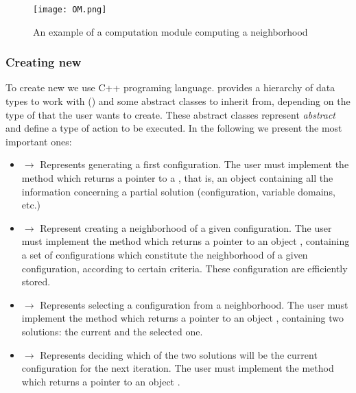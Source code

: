 \begin{figure}
	\centering	
	\texttt{[image: OM.png]}
	\caption{An example of a computation module computing a neighborhood}\label{fig:om}
\end{figure}

\subsubsection{Creating new \oms}
\label{subsubsec:creatingoms}

To create new \oms{} we use C++ programing language. \posl{} provides a hierarchy of data types to work with () and some abstract classes to inherit from, depending on the type of \om{} that the user wants to create. These abstract classes represent {\it abstract} \om{} and define a type of action to be executed. In the following we present the most important ones:

\begin{itemize}
\item {} $\rightarrow$ Represents \oms{} generating a first configuration. The user must implement the method  which returns a pointer to a , that is, an object containing all the information concerning a partial solution (configuration, variable domains, etc.)
\item {} $\rightarrow$ Represent \oms{} creating a neighborhood of a given configuration. The user must implement the method  which returns a pointer to an object , containing a set of configurations which constitute the neighborhood of a given configuration, according to certain criteria. These configuration are efficiently stored.
\item {} $\rightarrow$ Represents \oms{} selecting a configuration from a neighborhood. The user must implement the method  which returns a pointer to an object , containing two solutions: the current and the selected one.
\item {} $\rightarrow$ Represents \oms{} deciding which of the two solutions will be the current configuration for the next iteration. The user must implement the method  which returns a pointer to an object .
\end{itemize}

